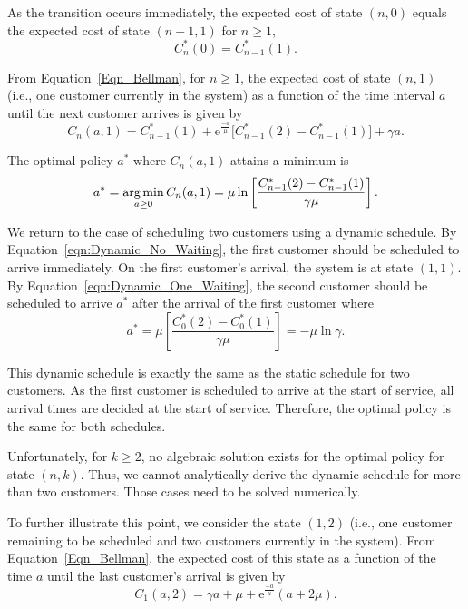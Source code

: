 As the transition occurs immediately, the expected cost of state $(n, 0)$ equals the expected cost of state $(n - 1, 1)$ for $n \geq 1$,
\begin{equation}
	C_{n}^{*} (0) = C_{n - 1}^{*} (1).
\end{equation}

From Equation~\ref{Eqn_Bellman}, for $n \geq 1$, the expected cost of state $(n, 1)$ (i.e., one customer currently in the system) as a function of the time interval $a$ until the next customer arrives is given by
\begin{equation}
	C_{n} (a, 1) = C_{n - 1}^{*} (1) + \mathrm{e}^{\frac{-a}{\mu}} \Big[ C_{n - 1}^{*} (2) - C_{n - 1}^{*} (1) \Big] + \gamma a.
\end{equation}

The optimal policy $a^{*}$ where $C_{n} (a, 1)$ attains a minimum is
\begin{equation}
	a^{*} = \operatorname*{arg\,min}_{a \geq 0} C_{n} (a, 1) = \mu \ln \left[ \frac{C_{n - 1}^{*} (2) - C_{n - 1}^{*} (1)}{\gamma \mu} \right].
	\label{eqn:Dynamic_One_Waiting}
\end{equation}

We return to the case of scheduling two customers using a dynamic schedule. By Equation~\ref{eqn:Dynamic_No_Waiting}, the first customer should be scheduled to arrive immediately. On the first customer's arrival, the system is at state $(1, 1)$. By Equation~\ref{eqn:Dynamic_One_Waiting}, the second customer should be scheduled to arrive $a^{*}$ after the arrival of the first customer where
\begin{equation}
	a^{*} = \mu \left[ \frac{C_{0}^{*} (2) - C_{0}^{*} (1)}{\gamma \mu} \right] = - \mu \ln \gamma.
\end{equation}

This dynamic schedule is exactly the same as the static schedule for two customers. As the first customer is scheduled to arrive at the start of service, all arrival times are decided at the start of service. Therefore, the optimal policy is the same for both schedules.

Unfortunately, for $k \geq 2$, no algebraic solution exists for the optimal policy for state $(n, k)$. Thus, we cannot analytically derive the dynamic schedule for more than two customers. Those cases need to be solved numerically.

To further illustrate this point, we consider the state $(1, 2)$ (i.e., one customer remaining to be scheduled and two customers currently in the system). From Equation~\ref{Eqn_Bellman}, the expected cost of this state as a function of the time $a$ until the last customer's arrival is given by
\begin{equation}
	C_{1} (a, 2) = \gamma a + \mu + \mathrm{e}^{\frac{-a}{\mu}} (a + 2 \mu).
\end{equation}

